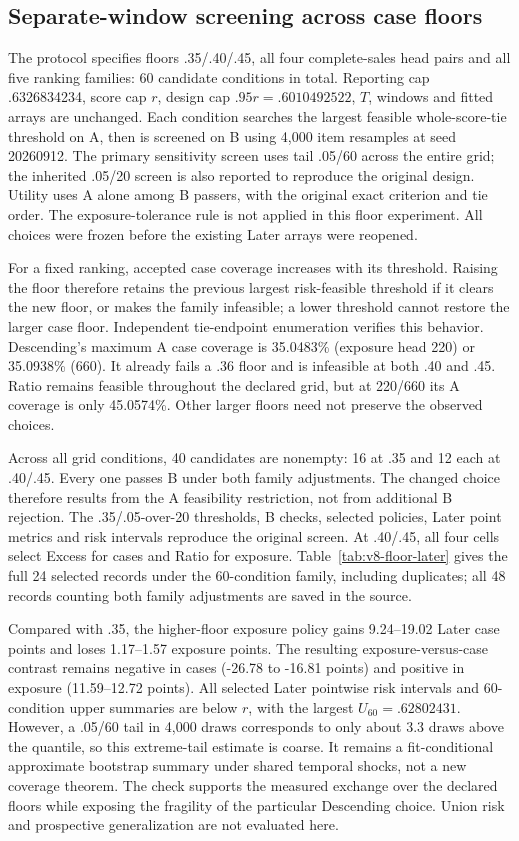 \FloatBarrier
\subsection{Separate-window screening across case floors}
\label{app:v8-floor}
The protocol specifies floors .35/.40/.45, all four complete-sales head pairs and all five ranking families: 60 candidate conditions in total. Reporting cap .6326834234, score cap $r$, design cap $.95r=.6010492522$, $T$, windows and fitted arrays are unchanged. Each condition searches the largest feasible whole-score-tie threshold on A, then is screened on B using 4,000 item resamples at seed 20260912. The primary sensitivity screen uses tail .05/60 across the entire grid; the inherited .05/20 screen is also reported to reproduce the original design. Utility uses A alone among B passers, with the original exact criterion and tie order. The exposure-tolerance rule is not applied in this floor experiment. All choices were frozen before the existing Later arrays were reopened.

For a fixed ranking, accepted case coverage increases with its threshold. Raising the floor therefore retains the previous largest risk-feasible threshold if it clears the new floor, or makes the family infeasible; a lower threshold cannot restore the larger case floor. Independent tie-endpoint enumeration verifies this behavior. Descending's maximum A case coverage is 35.0483\% (exposure head 220) or 35.0938\% (660). It already fails a .36 floor and is infeasible at both .40 and .45. Ratio remains feasible throughout the declared grid, but at 220/660 its A coverage is only 45.0574\%. Other larger floors need not preserve the observed choices.

Across all grid conditions, 40 candidates are nonempty: 16 at .35 and 12 each at .40/.45. Every one passes B under both family adjustments. The changed choice therefore results from the A feasibility restriction, not from additional B rejection. The .35/.05-over-20 thresholds, B checks, selected policies, Later point metrics and risk intervals reproduce the original screen. At .40/.45, all four cells select Excess for cases and Ratio for exposure. Table~\ref{tab:v8-floor-later} gives the full 24 selected records under the 60-condition family, including duplicates; all 48 records counting both family adjustments are saved in the source.

Compared with .35, the higher-floor exposure policy gains 9.24--19.02 Later case points and loses 1.17--1.57 exposure points. The resulting exposure-versus-case contrast remains negative in cases (-26.78 to -16.81 points) and positive in exposure (11.59--12.72 points). All selected Later pointwise risk intervals and 60-condition upper summaries are below $r$, with the largest $U_{60}=.62802431$. However, a .05/60 tail in 4,000 draws corresponds to only about 3.3 draws above the quantile, so this extreme-tail estimate is coarse. It remains a fit-conditional approximate bootstrap summary under shared temporal shocks, not a new coverage theorem. The check supports the measured exchange over the declared floors while exposing the fragility of the particular Descending choice. Union risk and prospective generalization are not evaluated here.
